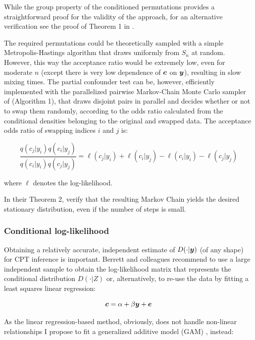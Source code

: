 \documentclass{article}
\begin{document}
While the group property of the conditioned permutations provides a straightforward proof for the validity of the approach, for an alternative verification see the proof of Theorem 1 in \citep{berrett2020conditional}.

The required permutations could be theoretically sampled with a simple Metropolis-Hastings algorithm that draws uniformly from $S_n$ at random. However, this way the acceptance ratio would be extremely low, even for moderate $n$ (except there is very low dependence of $\boldsymbol{c}$ on $\boldsymbol{y}$), resulting in slow mixing times. The partial confounder test can be, however, efficiently implemented with the parallelized pairwise Markov-Chain Monte Carlo sampler of \cite{berrett2020conditional} (Algorithm 1), that draws disjoint pairs in parallel and decides whether or not to swap them randomly, according to the odds ratio calculated from the conditional densities belonging to the original and swapped data. The acceptance odds ratio of swapping indices $i$ and $j$ is:

\begin{equation}
\frac{ q(c_j | y_i) q(c_i | y_j)}{q(c_i | y_i) q(c_j | y_j) }
=
\ell(c_j | y_i) + \ell(c_i | y_j) - \ell(c_i | y_i) - \ell(c_j | y_j) 
\label{eq:accept-odds}
\end{equation}

where $\ell$ denotes the log-likelihood.

In their Theorem 2, \cite{berrett2020conditional} verify that the resulting Markov Chain yields the desired stationary distribution, even if the number of steps is small.

\subsubsection*{Conditional log-likelihood}


Obtaining a relatively accurate, independent estimate of $D(\cdot|\boldsymbol{y})$ (of any shape) for CPT inference is important. Berrett and colleagues recommend to use a large independent sample to obtain the log-likelihood matrix that represents the conditional distribution $D(\cdot|Z)$ or, alternatively, to re-use the data by fitting a least squares linear regression:

\begin{equation}
    \label{eq:linreg}
    \boldsymbol{c} = \alpha + \beta \boldsymbol{y} + \boldsymbol{e}
\end{equation}

As the linear regression-based method, obviously, does not handle non-linear relationships I propose to fit a generalized additive model (GAM) \citep{hastie1987generalized}, instead:
\end{document}
